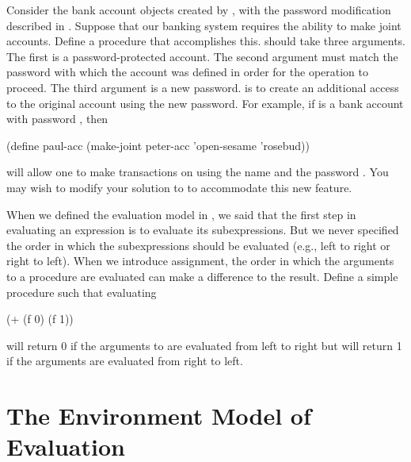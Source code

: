 \begin{exerciseGroup}
\label{Exercise 3.7}
 Consider the bank account objects
created by , with the password modification described in
.  Suppose that our banking system requires the ability to
make joint accounts.  Define a procedure  that accomplishes
this.   should take three arguments.  The first is a
password-protected account.  The second argument must match the password with
which the account was defined in order for the  operation to
proceed.  The third argument is a new password.   is to create
an additional access to the original account using the new password.  For
example, if  is a bank account with password
, then

\begin{codeBlock}
(define paul-acc
  (make-joint peter-acc 'open-sesame 'rosebud))
\end{codeBlock}

\noindent
will allow one to make transactions on  using the name
 and the password .  You may wish to modify your
solution to  to accommodate this new feature.

\label{Exercise 3.8}
 When we defined the evaluation
model in , we said that the first step in evaluating an
expression is to evaluate its subexpressions.  But we never specified the order
in which the subexpressions should be evaluated (e.g., left to right or right
to left).  When we introduce assignment, the order in which the arguments to a
procedure are evaluated can make a difference to the result.  Define a simple
procedure  such that evaluating

\begin{codeBlock}
(+ (f 0) (f 1))
\end{codeBlock}

will return 0 if
the arguments to \code{+} are evaluated from left to right but will return 1 if
the arguments are evaluated from right to left.
\end{exerciseGroup}

\section{The Environment Model of Evaluation}
\label{Section 3.2}

